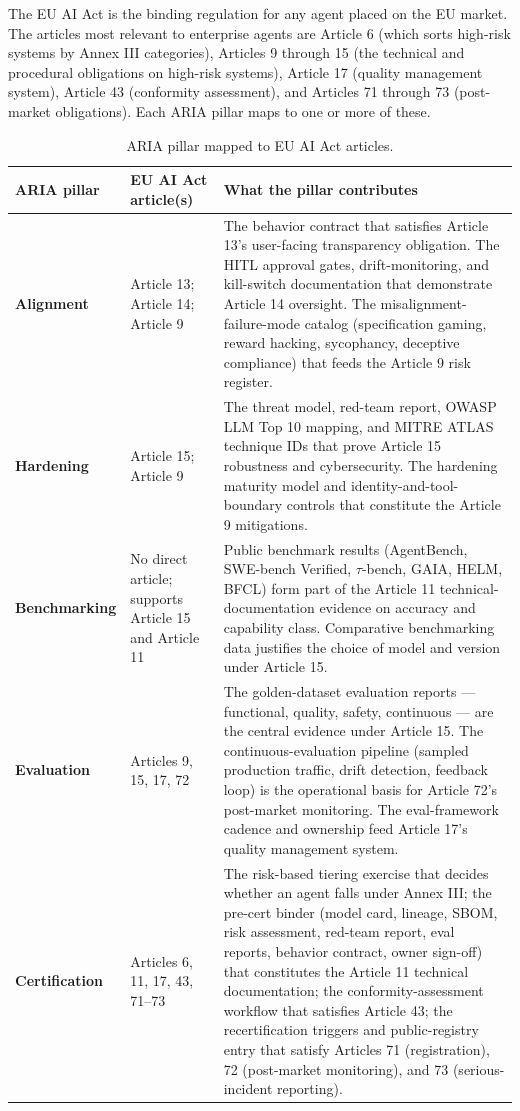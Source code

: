 \starttwocol
The EU AI Act is the binding regulation for any agent placed on the EU market. The articles most relevant to enterprise agents are Article 6 (which sorts high-risk systems by Annex III categories), Articles 9 through 15 (the technical and procedural obligations on high-risk systems), Article 17 (quality management system), Article 43 (conformity assessment), and Articles 71 through 73 (post-market obligations). Each ARIA pillar maps to one or more of these.
\begin{table}[tb]
\centering
\small
\caption{ARIA pillar mapped to EU AI Act articles.}
\begin{tabularx}{\textwidth}{@{}l l X@{}}
\toprule
\textbf{ARIA pillar} & \textbf{EU AI Act article(s)} & \textbf{What the pillar contributes} \\
\midrule
\textbf{Alignment} & Article 13; Article 14; Article 9 & The behavior contract that satisfies Article 13's user-facing transparency obligation. The HITL approval gates, drift-monitoring, and kill-switch documentation that demonstrate Article 14 oversight. The misalignment-failure-mode catalog (specification gaming, reward hacking, sycophancy, deceptive compliance) that feeds the Article 9 risk register. \\
\addlinespace
\textbf{Hardening} & Article 15; Article 9 & The threat model, red-team report, OWASP LLM Top 10 mapping, and MITRE ATLAS technique IDs that prove Article 15 robustness and cybersecurity. The hardening maturity model and identity-and-tool-boundary controls that constitute the Article 9 mitigations. \\
\addlinespace
\textbf{Benchmarking} & No direct article; supports Article 15 and Article 11 & Public benchmark results (AgentBench, SWE-bench Verified, $\tau$-bench, GAIA, HELM, BFCL) form part of the Article 11 technical-documentation evidence on accuracy and capability class. Comparative benchmarking data justifies the choice of model and version under Article 15. \\
\addlinespace
\textbf{Evaluation} & Articles 9, 15, 17, 72 & The golden-dataset evaluation reports --- functional, quality, safety, continuous --- are the central evidence under Article 15. The continuous-evaluation pipeline (sampled production traffic, drift detection, feedback loop) is the operational basis for Article 72's post-market monitoring. The eval-framework cadence and ownership feed Article 17's quality management system. \\
\addlinespace
\textbf{Certification} & Articles 6, 11, 17, 43, 71--73 & The risk-based tiering exercise that decides whether an agent falls under Annex III; the pre-cert binder (model card, lineage, SBOM, risk assessment, red-team report, eval reports, behavior contract, owner sign-off) that constitutes the Article 11 technical documentation; the conformity-assessment workflow that satisfies Article 43; the recertification triggers and public-registry entry that satisfy Articles 71 (registration), 72 (post-market monitoring), and 73 (serious-incident reporting). \\
\bottomrule
\end{tabularx}
\end{table}
